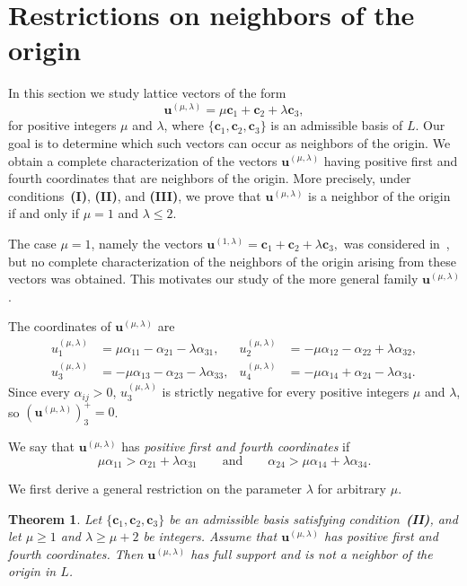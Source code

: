 \documentclass[12pt,a4paper]{amsart}
\newtheorem{theorem}{Theorem}[section]
\theoremstyle{definition}
\begin{document}
\section{Restrictions on neighbors of the origin}
\label{sec:lambda}

In this section we study lattice vectors of the form
\[
\mathbf u^{(\mu,\lambda)}
=
\mu\mathbf c_1+\mathbf c_2+\lambda\mathbf c_3,
\]
for positive integers $\mu$ and $\lambda$, where
$\{\mathbf c_1,\mathbf c_2,\mathbf c_3\}$ is an admissible basis of
$L$. Our goal is to determine which such vectors can occur as neighbors
of the origin. We obtain a complete characterization of the vectors
$\mathbf u^{(\mu,\lambda)}$ having positive first and fourth
coordinates that are neighbors of the origin. More precisely, under
conditions~\textup{\textbf{(I)}}, \textup{\textbf{(II)}}, and
\textup{\textbf{(III)}}, we prove that
$\mathbf u^{(\mu,\lambda)}$ is a neighbor of the origin if and only if
$\mu=1$ and $\lambda\le2$.

The case $\mu=1$, namely the vectors
$
\mathbf u^{(1,\lambda)}
=
\mathbf c_1+\mathbf c_2+\lambda\mathbf c_3,
$
was considered in~\cite{OP}, but no complete characterization of the
neighbors of the origin arising from these vectors was obtained. This
motivates our study of the more general family
$\mathbf u^{(\mu,\lambda)}$.

The coordinates of $\mathbf u^{(\mu,\lambda)}$ are
\[
\begin{aligned}
u^{(\mu,\lambda)}_1&=\mu\alpha_{11}-\alpha_{21}-\lambda\alpha_{31},&
u^{(\mu,\lambda)}_2&=-\mu\alpha_{12}-\alpha_{22}+\lambda\alpha_{32},\\
u^{(\mu,\lambda)}_3&=-\mu\alpha_{13}-\alpha_{23}-\lambda\alpha_{33},&
u^{(\mu,\lambda)}_4&=-\mu\alpha_{14}+\alpha_{24}-\lambda\alpha_{34}.
\end{aligned}
\]
Since every $\alpha_{ij}>0$, $u^{(\mu,\lambda)}_3$ is strictly
negative for every positive integers $\mu$ and $\lambda$, so
$(\mathbf u^{(\mu,\lambda)})^+_3=0$.

We say that $\mathbf u^{(\mu,\lambda)}$ has \emph{positive first and
fourth coordinates} if
\[
\mu\alpha_{11}>\alpha_{21}+\lambda\alpha_{31}
\qquad\text{and}\qquad
\alpha_{24}>\mu\alpha_{14}+\lambda\alpha_{34}.
\]

We first derive a general restriction on the parameter $\lambda$ for
arbitrary $\mu$.

\begin{theorem}\label{thm:mu-lambda}
Let $\{\mathbf c_1,\mathbf c_2,\mathbf c_3\}$ be an admissible basis
satisfying condition~\textup{\textbf{(II)}}, and let $\mu\ge1$ and
$\lambda\ge\mu+2$ be integers.
Assume that $\mathbf u^{(\mu,\lambda)}$ has positive first and
fourth coordinates. Then $\mathbf u^{(\mu,\lambda)}$ has full support and is not a
neighbor of the origin in $L$.
\end{theorem}
\end{document}
